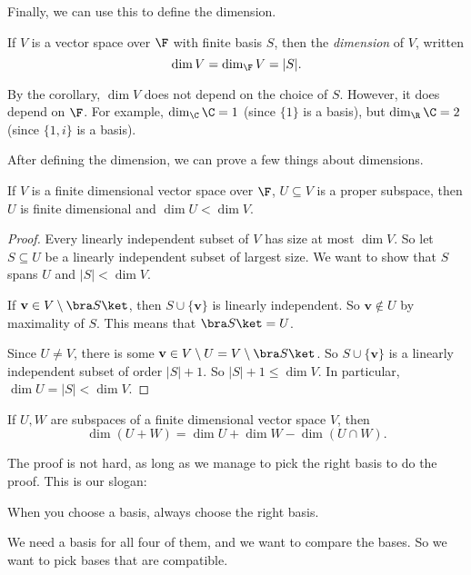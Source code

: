 \documentclass[a4paper]{article}
\begin{document}
Finally, we can use this to define the dimension.
\begin{defi}[Dimension]
  If $V$ is a vector space over $\F$ with finite basis $S$, then the \emph{dimension} of $V$, written
  \[
    \dim V = \dim_{\F}V = |S|.
  \]
\end{defi}
By the corollary, $\dim V$ does not depend on the choice of $S$. However, it does depend on $\F$. For example, $\dim_\C \C = 1$ (since $\{1\}$ is a basis), but $\dim_\R \C = 2$ (since $\{1, i\}$ is a basis).

After defining the dimension, we can prove a few things about dimensions.
\begin{lemma}
  If $V$ is a finite dimensional vector space over $\F$, $U\subseteq V$ is a proper subspace, then $U$ is finite dimensional and $\dim U < \dim V$.
\end{lemma}

\begin{proof}
  Every linearly independent subset of $V$ has size at most $\dim V$. So let $S \subseteq U$ be a linearly independent subset of largest size. We want to show that $S$ spans $U$ and $|S| < \dim V$.

  If $\mathbf{v}\in V\setminus \bra S\ket$, then $S\cup \{\mathbf{v}\}$ is linearly independent. So $\mathbf{v}\not\in U$ by maximality of $S$. This means that $\bra S\ket = U$.

  Since $U\not= V$, there is some $\mathbf{v}\in V\setminus U = V\setminus \bra S\ket$. So $S\cup \{\mathbf{v}\}$ is a linearly independent subset of order $|S| + 1$. So $|S| + 1 \leq \dim V$. In particular, $\dim U = |S| < \dim V$.
\end{proof}

\begin{prop}
  If $U, W$ are subspaces of a finite dimensional vector space $V$, then
  \[
    \dim (U + W) = \dim U + \dim W - \dim (U\cap W).
  \]
\end{prop}
The proof is not hard, as long as we manage to pick the right basis to do the proof. This is our slogan:
\begin{center}
  When you choose a basis, always choose the right basis.
\end{center}
We need a basis for all four of them, and we want to compare the bases. So we want to pick bases that are compatible.
\end{document}
